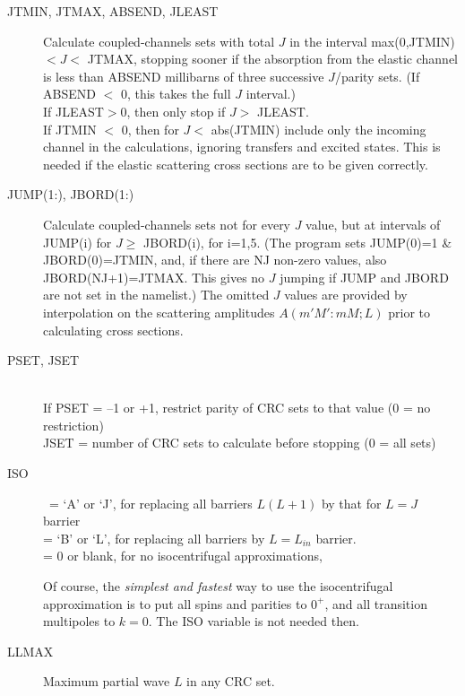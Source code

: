 \documentclass[11pt]{article}
\begin{document}
\begin{description}

\item[JTMIN, JTMAX, ABSEND, JLEAST]
Calculate coupled-channels sets with total $J$ in the interval
max(0,JTMIN) $ < J  <$ JTMAX,
stopping sooner if the absorption from the elastic channel
is less than ABSEND millibarns of three successive $J$/parity sets.
(If ABSEND $<$ 0, this takes the full $J$ interval.)\\
If JLEAST$>0$, then only stop if $J>$ JLEAST.
\\
If JTMIN $<$ 0, then for $J <$ abs(JTMIN) include only the incoming channel
in the calculations, ignoring transfers and excited states.
This is needed if the elastic scattering cross sections are to be given
correctly.



\item[JUMP(1:), JBORD(1:)]
Calculate coupled-channels sets not for every $J$
value, but at intervals of JUMP(i) for  $J\geq$ JBORD(i), for i=1,5.
(The program sets JUMP(0)=1 \& JBORD(0)=JTMIN, and, 
if there are NJ non-zero values, also JBORD(NJ+1)=JTMAX.  
This gives no $J$ jumping if JUMP and JBORD are not set in the namelist.)
The omitted $J$ values are provided by interpolation on the scattering
amplitudes $A(m'M':mM; L)$ prior to calculating cross sections.

\item[PSET, JSET] ~\\
If PSET =  --1 or +1,  restrict parity of CRC sets to that value (0 = no restriction)\\

JSET = number of CRC sets to calculate before stopping (0 = all sets)

\item[ISO]
\ = `A' or `J', for replacing all barriers $L(L+1)$ by that for $L = J$ barrier
\\ = `B' or `L', for replacing all barriers by $L = L_{in}$ barrier.
 \\ = 0 or blank, for no isocentrifugal approximations,

Of course, the {\em simplest and fastest} way to use the isocentrifugal
approximation is to put all spins and parities to $0^+$, and all
transition multipoles to $k=0$. The ISO variable is not needed then.

\item[LLMAX] Maximum partial wave $L$ in any CRC set.
\end{description}
\end{document}
